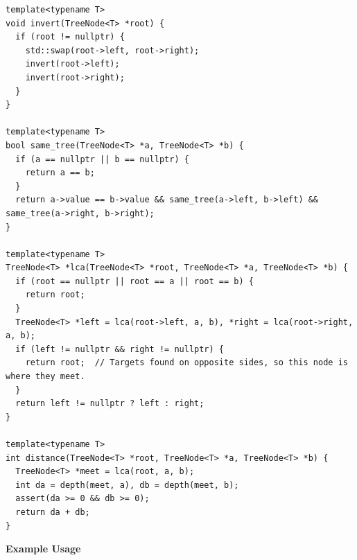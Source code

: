 \begin{lstlisting}[style=cpp]
template<typename T>
void invert(TreeNode<T> *root) {
  if (root != nullptr) {
    std::swap(root->left, root->right);
    invert(root->left);
    invert(root->right);
  }
}

template<typename T>
bool same_tree(TreeNode<T> *a, TreeNode<T> *b) {
  if (a == nullptr || b == nullptr) {
    return a == b;
  }
  return a->value == b->value && same_tree(a->left, b->left) && same_tree(a->right, b->right);
}

template<typename T>
TreeNode<T> *lca(TreeNode<T> *root, TreeNode<T> *a, TreeNode<T> *b) {
  if (root == nullptr || root == a || root == b) {
    return root;
  }
  TreeNode<T> *left = lca(root->left, a, b), *right = lca(root->right, a, b);
  if (left != nullptr && right != nullptr) {
    return root;  // Targets found on opposite sides, so this node is where they meet.
  }
  return left != nullptr ? left : right;
}

template<typename T>
int distance(TreeNode<T> *root, TreeNode<T> *a, TreeNode<T> *b) {
  TreeNode<T> *meet = lca(root, a, b);
  int da = depth(meet, a), db = depth(meet, b);
  assert(da >= 0 && db >= 0);
  return da + db;
}
\end{lstlisting}
\textbf{Example Usage}\par
